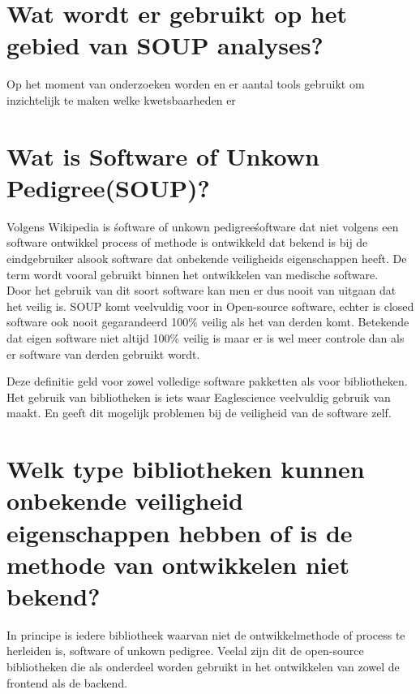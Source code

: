 \section{Wat wordt er gebruikt op het gebied van SOUP analyses?}
Op het moment van onderzoeken worden en er aantal tools gebruikt om inzichtelijk te maken welke kwetsbaarheden er



\section{Wat is Software of Unkown Pedigree(SOUP)?}
Volgens Wikipedia is \'software of unkown pedigree\' software dat niet volgens een software ontwikkel process of methode is ontwikkeld dat bekend is bij de eindgebruiker alsook software dat onbekende veiligheids eigenschappen heeft. De term wordt vooral gebruikt binnen het ontwikkelen van medische software.\\  %
Door het gebruik van dit soort software kan men er dus nooit van uitgaan dat het veilig is.  SOUP komt veelvuldig voor in Open-source software, echter is closed software ook nooit gegarandeerd 100\% veilig als het van derden komt. Betekende dat eigen software niet altijd 100\% veilig is maar er is wel meer controle dan als er software van derden gebruikt wordt.

Deze definitie geld voor zowel volledige software pakketten als voor bibliotheken. Het gebruik van bibliotheken is iets waar Eaglescience veelvuldig gebruik van maakt. En geeft dit mogelijk problemen bij de veiligheid van de software zelf.

\section{Welk type bibliotheken kunnen onbekende veiligheid eigenschappen hebben of is de methode van ontwikkelen niet bekend?}
In principe is iedere bibliotheek waarvan niet de ontwikkelmethode of process te herleiden is, software of unkown pedigree. Veelal zijn dit de open-source bibliotheken die als onderdeel worden gebruikt in het ontwikkelen van zowel de frontend als de backend.

